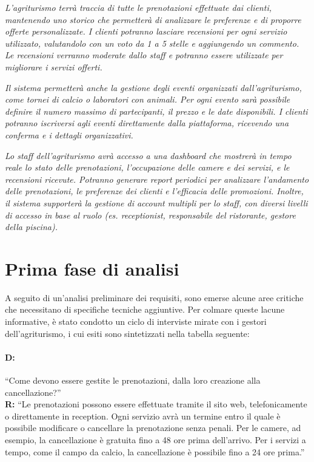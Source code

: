 \documentclass[a4paper,12pt]{report}
\begin{document}
\textit{L'agriturismo terrà traccia di tutte le prenotazioni effettuate dai clienti, mantenendo uno storico che permetterà
	di analizzare le preferenze e di proporre offerte personalizzate. I clienti potranno lasciare recensioni per ogni servizio utilizzato, valutandolo
	con un voto da 1 a 5 stelle e aggiungendo un commento. Le recensioni verranno moderate dallo staff e potranno essere utilizzate per
	migliorare i servizi offerti.}

\textit{Il sistema permetterà anche la gestione degli eventi organizzati dall'agriturismo, come tornei di calcio o laboratori con animali. Per ogni
	evento sarà possibile definire il numero massimo di partecipanti, il prezzo e le date disponibili. I clienti potranno iscriversi agli eventi direttamente
	dalla piattaforma, ricevendo una conferma e i dettagli organizzativi.}

\textit{Lo staff dell'agriturismo avrà accesso a una dashboard che mostrerà in tempo reale lo stato delle prenotazioni, l'occupazione delle
	camere e dei servizi, e le recensioni ricevute. Potranno generare report periodici per analizzare l'andamento delle prenotazioni, le preferenze dei clienti e
	l'efficacia delle promozioni. Inoltre, il sistema supporterà la gestione di account multipli per lo staff, con diversi livelli di accesso in base al
	ruolo (es. receptionist, responsabile del ristorante, gestore della piscina).}

\section{Prima fase di analisi}
A seguito di un'analisi preliminare dei requisiti, sono emerse alcune aree critiche che necessitano di specifiche tecniche
aggiuntive. Per colmare queste lacune informative, è stato condotto un ciclo di interviste mirate con i gestori dell'agriturismo, i
cui esiti sono sintetizzati nella tabella seguente:

\paragraph{D:}
“Come devono essere gestite le prenotazioni, dalla loro creazione alla cancellazione?”
\\ {\bf R:} “Le prenotazioni possono essere effettuate tramite il sito web, telefonicamente o direttamente in reception. Ogni servizio avrà un termine
entro il quale è possibile modificare o cancellare la prenotazione senza penali. Per le camere, ad esempio, la cancellazione è gratuita fino a 48 ore prima
dell'arrivo. Per i servizi a tempo, come il campo da calcio, la cancellazione è possibile fino a 24 ore prima.”
\end{document}
